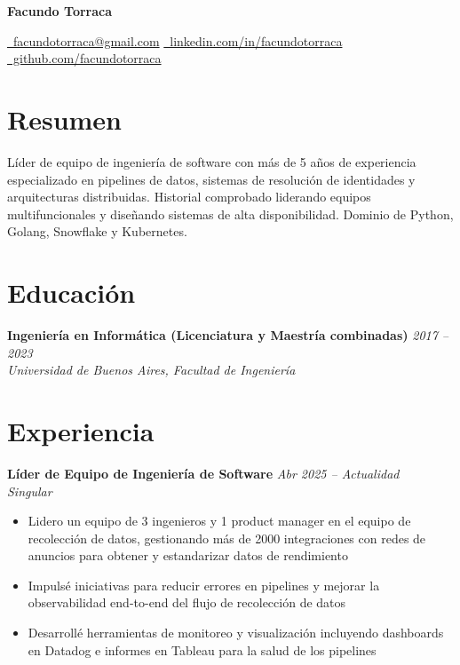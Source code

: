 \documentclass[10pt,a4paper]{article}
\newcommand{\cventry}[3]{%
  \textbf{#1} \hfill \textit{#3}\\[3pt]
  \textit{#2}%
}
\begin{document}
\begin{center}
  {\LARGE\bfseries Facundo Torraca}

  \vspace{0.25cm}

  \href{mailto:facundotorraca@gmail.com}
    {\faEnvelope\ facundotorraca@gmail.com}
  \quad\textperiodcentered\quad
  \href{https://linkedin.com/in/facundotorraca}
    {\faLinkedin\ linkedin.com/in/facundotorraca}
  \quad\textperiodcentered\quad
  \href{https://github.com/facundotorraca}
    {\faGithub\ github.com/facundotorraca}
\end{center}

\section*{Resumen}
Líder de equipo de ingeniería de software con más de 5 años de experiencia
especializado en pipelines de datos, sistemas de resolución de identidades y
arquitecturas distribuidas. Historial comprobado liderando equipos
multifuncionales y diseñando sistemas de alta disponibilidad. Dominio de
Python, Golang, Snowflake y Kubernetes.

\section*{Educación}

\cventry{Ingeniería en Informática (Licenciatura y Maestría combinadas)}%
  {Universidad de Buenos Aires, Facultad de Ingeniería}{2017 -- 2023}

\section*{Experiencia}

\cventry{Líder de Equipo de Ingeniería de Software}{Singular}{Abr 2025 -- Actualidad}
\begin{itemize}[leftmargin=*, noitemsep, topsep=3pt, itemsep=2pt]
  \item Lidero un equipo de 3 ingenieros y 1 product manager en el equipo de
        recolección de datos, gestionando más de 2000 integraciones con redes
        de anuncios para obtener y estandarizar datos de rendimiento
  \item Impulsé iniciativas para reducir errores en pipelines y mejorar la
        observabilidad end-to-end del flujo de recolección de datos
  \item Desarrollé herramientas de monitoreo y visualización incluyendo
        dashboards en Datadog e informes en Tableau para la salud de los pipelines
\end{itemize}
\end{document}
